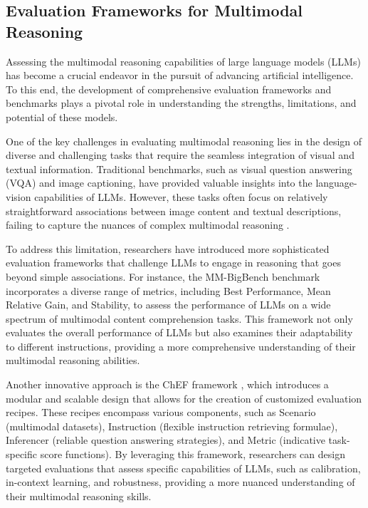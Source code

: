\documentclass[11pt]{article}
\begin{document}
\subsection{Evaluation Frameworks for Multimodal Reasoning}

Assessing the multimodal reasoning capabilities of large language models (LLMs) has become a crucial endeavor in the pursuit of advancing artificial intelligence. To this end, the development of comprehensive evaluation frameworks and benchmarks plays a pivotal role in understanding the strengths, limitations, and potential of these models.

One of the key challenges in evaluating multimodal reasoning lies in the design of diverse and challenging tasks that require the seamless integration of visual and textual information. Traditional benchmarks, such as visual question answering (VQA) and image captioning, have provided valuable insights into the language-vision capabilities of LLMs. However, these tasks often focus on relatively straightforward associations between image content and textual descriptions, failing to capture the nuances of complex multimodal reasoning \cite{ref185,ref152}.

To address this limitation, researchers have introduced more sophisticated evaluation frameworks that challenge LLMs to engage in reasoning that goes beyond simple associations. For instance, the MM-BigBench benchmark \cite{ref51} incorporates a diverse range of metrics, including Best Performance, Mean Relative Gain, and Stability, to assess the performance of LLMs on a wide spectrum of multimodal content comprehension tasks. This framework not only evaluates the overall performance of LLMs but also examines their adaptability to different instructions, providing a more comprehensive understanding of their multimodal reasoning abilities.

Another innovative approach is the ChEF framework \cite{ref54}, which introduces a modular and scalable design that allows for the creation of customized evaluation recipes. These recipes encompass various components, such as Scenario (multimodal datasets), Instruction (flexible instruction retrieving formulae), Inferencer (reliable question answering strategies), and Metric (indicative task-specific score functions). By leveraging this framework, researchers can design targeted evaluations that assess specific capabilities of LLMs, such as calibration, in-context learning, and robustness, providing a more nuanced understanding of their multimodal reasoning skills.
\end{document}
